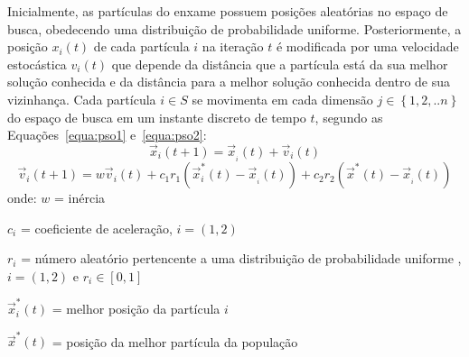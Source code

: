 Inicialmente, as partículas do enxame possuem posições aleatórias no espaço de busca, obedecendo uma distribuição de probabilidade uniforme. Posteriormente, a posição $ {x_i}\left( t \right) $ de cada partícula $ i $ na iteração $ t $ é modificada por uma velocidade estocástica $ {v_i}\left( t \right) $ que depende da distância que a partícula está da sua melhor solução conhecida e da distância para a melhor solução conhecida dentro de sua vizinhança. Cada partícula $i \in S$ se movimenta em cada dimensão $j \in \left\{ {1,2,..n} \right\}$ do espaço de busca em um instante discreto de tempo $ t $, segundo as Equações~\ref{equa:pso1} e~\ref{equa:pso2}:
\begin{equation}
{\overrightarrow x _i}\left( {t + 1} \right) = {\overrightarrow x _{_i}}\left( t \right) + {\overrightarrow v _i}\left( t \right)
\label{equa:pso1}
\end{equation}
%
\begin{equation}
{\overrightarrow v _i}\left( {t + 1} \right) = w{\overrightarrow v _i}\left( t \right) + {c_1}{r_1}\left( {\overrightarrow x _i^*\left( t \right) - {{\overrightarrow x }_{_i}}\left( t \right)} \right) + {c_2}{r_2}\left( {{{\overrightarrow x }^*}\left( t \right) - {{\overrightarrow x }_{_i}}\left( t \right)} \right)
\label{equa:pso2}
\end{equation}
onde:
$ w $ = inércia

$ c _i $ = coeficiente de aceleração, $i=\left( 1,2 \right)$

$ r _i $ = número aleatório pertencente a uma distribuição de probabilidade uniforme , $i=\left( 1,2 \right)$ e ${r_i} \in \left[ {0,1} \right]$

$  \overrightarrow x _i^*\left( t \right) $ = melhor posição da partícula $ i $
	
$ {\overrightarrow x }^*\left( t \right) $ = posição da melhor partícula da população
	
